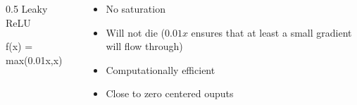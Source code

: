 \begin{frame}
	\begin{columns}
		\begin{column} {0.5\textwidth}
			Leaky ReLU
			\begin{center}
				
			\end{center}
			
			\begin{center}
				f(x) = max(0.01x,x)
			\end{center}
			
		\end{column}
		\begin{column}{0.5\textwidth}
			\begin{itemize}
				\justifying
				\item<1-> No saturation
				\item<2-> Will not die ($0.01 x$ ensures that at least a small gradient will flow through)
				\item<3-> Computationally efficient
				\item<4-> Close to zero centered ouputs
			\end{itemize}
			
		\end{column}
		
	\end{columns}    
\end{frame}


